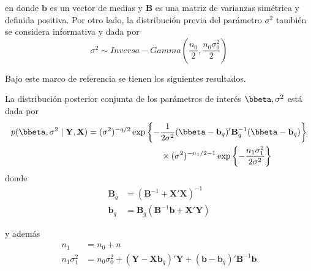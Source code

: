 en donde $\mathbf{b}$ es un vector de medias y $\mathbf{B}$ es una matriz de varianzas simétrica y definida positiva. Por otro lado, la distribución previa del parámetro $\sigma^2$ también se considera informativa y dada por
\begin{equation*}
\sigma^2 \sim Inversa-Gamma\left( \frac{n_0}{2}, \frac{n_0\sigma^2_0}{2} \right)
\end{equation*}

Bajo este marco de referencia se tienen los siguientes resultados.

\begin{Res}
La distribución posterior conjunta de los parámetros de interés $\bbeta,\sigma^2$ está dada por
\begin{align}
p(\bbeta,\sigma^2 \mid \mathbf{Y},\mathbf{X})
&=(\sigma^2)^{-q/2}
\exp\left\{-\frac{1}{2\sigma^2}(\bbeta-\mathbf{b}_q)'\mathbf{B}_q^{-1}(\bbeta-\mathbf{b}_q)\right\}
\notag
\\ &\hspace{3cm} \times
(\sigma^2)^{-n_1/2-1}
\exp\left\{-\frac{n_1\sigma^2_1}{2\sigma^2}\right\}
\end{align}
donde
\begin{align*}
\mathbf{B}_q &= \left(\mathbf{B}^{-1}+\mathbf{X}'\mathbf{X}\right)^{-1}\\
\mathbf{b}_q &=\mathbf{B}_q\left(\mathbf{B}^{-1}\mathbf{b}+\mathbf{X}'\mathbf{Y}\right)
\end{align*}

y además
\begin{align*}
n_1&=n_0+n\\
n_1\sigma^2_1&=
n_0\sigma^2_0+(\mathbf{Y}-\mathbf{X}\mathbf{b}_q)'\mathbf{Y}+(\mathbf{b}-\mathbf{b}_q)'\mathbf{B}^{-1}\mathbf{b}
\end{align*}
\end{Res}

